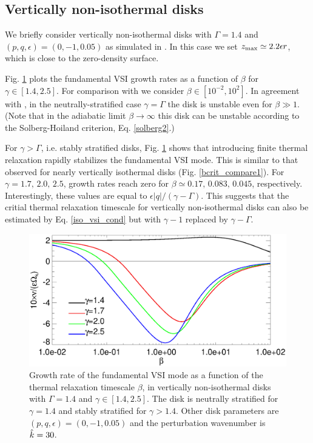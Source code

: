 \subsection{Vertically non-isothermal disks} 
We briefly consider vertically non-isothermal disks with 
$\Gamma=1.4$ and $(p,q,\epsilon)=(0,-1,0.05)$ as simulated in
\cite{nelson13}. In this case we set $z_\mathrm{max}\simeq2.2\epsilon r$, which
is close to the zero-density surface.      

Fig. \ref{gcorr_compare_vnoniso} plots the fundamental VSI growth
rates as a function of $\beta$ for $\gamma\in[1.4,2.5]$. For
comparison with \cite{nelson13} we consider 
$\beta\in[10^{-2},10^2]$. In agreement with \citeauthor{nelson13}, in
the neutrally-stratified case $\gamma=\Gamma$ the disk is unstable
even for $\beta\gg 1$. (Note that in the adiabatic limit
$\beta\to\infty$ this disk can be unstable according to the
Solberg-Hoiland criterion, Eq. \ref{solberg2}.) 

For $\gamma>\Gamma$, i.e. stably stratified disks,
Fig. \ref{gcorr_compare_vnoniso} shows that introducing finite thermal
relaxation rapidly stabilizes the fundamental VSI mode. This is
similar to that observed for nearly vertically isothermal disks
(Fig. \ref{bcrit_compare1}). For $\gamma=1.7,\,2.0,\,2.5$, growth
rates reach zero for  $\beta\simeq0.17,\,0.083,\,0.045$, respectively.
Interestingly, these values are equal to
$\epsilon|q|/(\gamma-\Gamma)$. This suggests that the critial thermal
relaxation timescale for vertically non-isothermal disks can also be
estimated by Eq. \ref{iso_vsi_cond} but with $\gamma-1$ replaced by
$\gamma-\Gamma$. 

\begin{figure}
  \includegraphics[width=\linewidth,clip=true,trim=0cm 0cm 0cm
  0cm]{figures/gcorr_compare_vnoniso}
  \caption{Growth rate of the fundamental VSI mode as a function of
    the thermal relaxation timescale $\beta$, in vertically
    non-isothermal disks with $\Gamma=1.4$ and
    $\gamma\in[1.4,2.5]$. The disk is neutrally
    stratified for $\gamma=1.4$ and stably stratified for
    $\gamma>1.4$. Other disk parameters are
    $(p,q,\epsilon)=(0,-1,0.05)$ and the perturbation wavenumber is
    $\hat{k}=30$.  
    \label{gcorr_compare_vnoniso}}
\end{figure}












